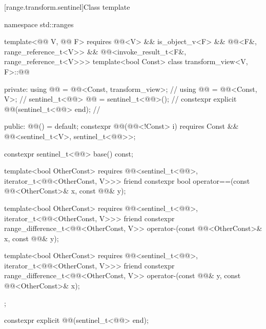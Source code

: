 [range.transform.sentinel]{Class template }

%
\begin{codeblock}
namespace std::ranges {
  template<@@ V, @@ F>
    requires @@<V> && is_object_v<F> &&
             @@<F&, range_reference_t<V>> &&
             @@<invoke_result_t<F&, range_reference_t<V>>>
  template<bool Const>
  class transform_view<V, F>::@@ {
  private:
    using @@ = @@<Const, transform_view>;  // \expos
    using @@ = @@<Const, V>;                 // \expos
    sentinel_t<@@> @@ = sentinel_t<@@>();         // \expos
    constexpr explicit @@(sentinel_t<@@> end);  // \expos

  public:
    @@() = default;
    constexpr @@(@@<!Const> i)
      requires Const && @@<sentinel_t<V>, sentinel_t<@@>>;

    constexpr sentinel_t<@@> base() const;

    template<bool OtherConst>
      requires @@<sentinel_t<@@>, iterator_t<@@<OtherConst, V>>>
    friend constexpr bool operator==(const @@<OtherConst>& x, const @@& y);

    template<bool OtherConst>
      requires @@<sentinel_t<@@>, iterator_t<@@<OtherConst, V>>>
    friend constexpr range_difference_t<@@<OtherConst, V>>
      operator-(const @@<OtherConst>& x, const @@& y);

    template<bool OtherConst>
      requires @@<sentinel_t<@@>, iterator_t<@@<OtherConst, V>>>
    friend constexpr range_difference_t<@@<OtherConst, V>>
      operator-(const @@& y, const @@<OtherConst>& x);
  };
}
\end{codeblock}

%
\begin{itemdecl}
constexpr explicit @@(sentinel_t<@@> end);
\end{itemdecl}

